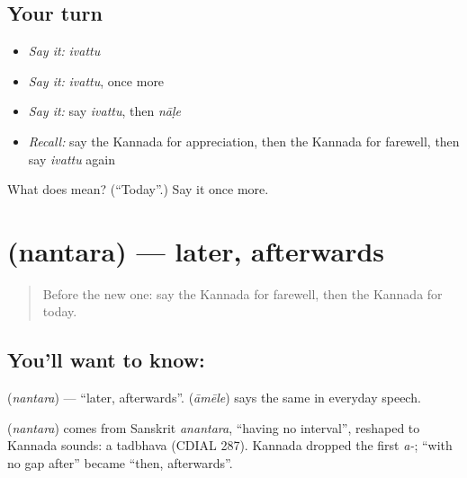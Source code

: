 \subsection*{Your turn}
\begin{itemize}
\raggedright
  \item \emph{Say it:} \emph{ivattu}
  \item \emph{Say it:} \emph{ivattu}, once more
  \item \emph{Say it:} say \emph{ivattu}, then \emph{nāḷe}
  \item \emph{Recall:} say the Kannada for appreciation, then the Kannada for farewell, then say \emph{ivattu} again
\end{itemize}

\begin{tcolorbox}[breakable,colback=teal!4,colframe=teal!35!black,title={Before you move on}]
What does  mean? (\textquotedblleft{}Today\textquotedblright{}.) Say it once more.
\end{tcolorbox}
\section[\texorpdfstring{\kn{ನಂತರ} (nantara)}{ನಂತರ (nantara)}]{ (nantara) — later, afterwards}

\label{lesson:KA-C106-later}



\begin{quote}
Before the new one: say the Kannada for farewell, then the Kannada for today.
\end{quote}

\subsection*{You'll want to know: }
\textbf{} (\emph{nantara}) — \textquotedblleft{}later, afterwards\textquotedblright{}. \textbf{} (\emph{āmēle}) says the same in everyday speech.

\begin{cousinweb}
\textbf{} (\emph{nantara}) comes from Sanskrit \emph{anantara}, \textquotedblleft{}having no interval\textquotedblright{}, reshaped to Kannada sounds: a tadbhava (CDIAL 287). Kannada dropped the first \emph{a-}; \textquotedblleft{}with no gap after\textquotedblright{} became \textquotedblleft{}then, afterwards\textquotedblright{}.
\end{cousinweb}

